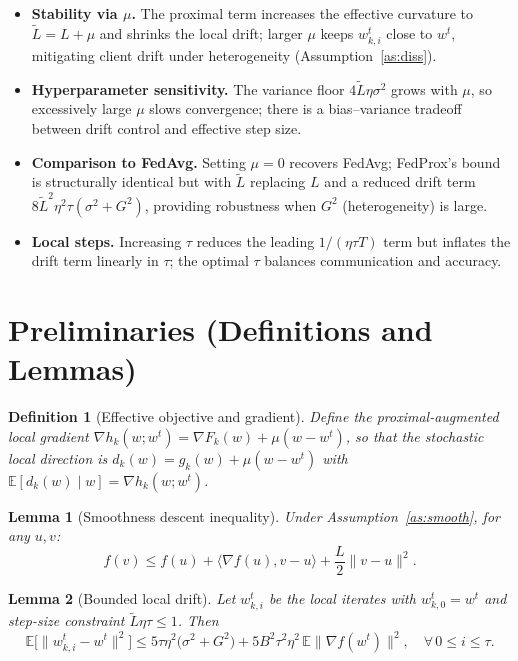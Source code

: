 \documentclass{article}
\newtheorem{lemma}{Lemma}
\newtheorem{definition}{Definition}
\begin{document}
\begin{itemize}
\item \textbf{Stability via $\mu$.} The proximal term increases the effective curvature to $\tilde L = L + \mu$ and shrinks the local drift; larger $\mu$ keeps $w_{k,i}^t$ close to $w^t$, mitigating client drift under heterogeneity (Assumption~\ref{as:diss}).
\item \textbf{Hyperparameter sensitivity.} The variance floor $4\tilde L \eta \sigma^2$ grows with $\mu$, so excessively large $\mu$ slows convergence; there is a bias–variance tradeoff between drift control and effective step size.
\item \textbf{Comparison to FedAvg.} Setting $\mu = 0$ recovers FedAvg; FedProx's bound is structurally identical but with $\tilde L$ replacing $L$ and a reduced drift term $8\tilde L^2 \eta^2 \tau (\sigma^2 + G^2)$, providing robustness when $G^2$ (heterogeneity) is large.
\item \textbf{Local steps.} Increasing $\tau$ reduces the leading $1/(\eta\tau T)$ term but inflates the drift term linearly in $\tau$; the optimal $\tau$ balances communication and accuracy.
\end{itemize}

\section*{Preliminaries (Definitions and Lemmas)}

\begin{definition}[Effective objective and gradient]
Define the proximal-augmented local gradient
$\nabla h_k(w; w^t) = \nabla F_k(w) + \mu (w - w^t)$, so that the stochastic local direction is
$d_k(w) = g_k(w) + \mu(w - w^t)$ with $\mathbb{E}[d_k(w)\mid w] = \nabla h_k(w;w^t)$.
\end{definition}

\begin{lemma}[Smoothness descent inequality]\label{lem:descent}
Under Assumption~\ref{as:smooth}, for any $u, v$:
\[
f(v) \le f(u) + \langle \nabla f(u), v-u\rangle + \frac{L}{2}\|v - u\|^2 .
\]
\end{lemma}

\begin{lemma}[Bounded local drift]\label{lem:drift}
Let $w_{k,i}^t$ be the local iterates with $w_{k,0}^t = w^t$ and step-size constraint $\tilde L \eta \tau \le 1$. Then
\[
\mathbb{E}\big[\|w_{k,i}^t - w^t\|^2\big] \le 5\tau \eta^2 \big(\sigma^2 + G^2\big) + 5 B^2 \tau^2 \eta^2 \,\mathbb{E}\|\nabla f(w^t)\|^2 ,
\quad \forall\, 0 \le i \le \tau.
\]
\end{lemma}
\end{document}
